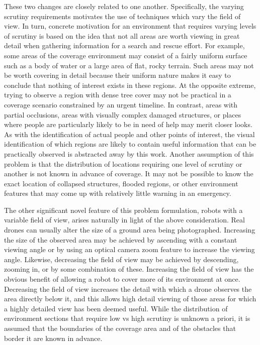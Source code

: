 These two changes are closely related to one another. Specifically, the varying scrutiny requirements motivates the use of techniques which vary the field of view. In turn, concrete motivation for an environment that requires varying levels of scrutiny is based on the idea that not all areas are worth viewing in great detail when gathering information for a search and rescue effort. For example, some areas of the coverage environment may consist of a fairly uniform surface such as a body of water or a large area of flat, rocky terrain. Such areas may not be worth covering in detail because their uniform nature makes it easy to conclude that nothing of interest exists in these regions. At the opposite extreme, trying to observe a region with dense tree cover may not be practical in a coverage scenario constrained by an urgent timeline. In contrast, areas with partial occlusions, areas with visually complex damaged structures, or places where people are particularly likely to be in need of help may merit closer looks. As with the identification of actual people and other points of interest, the visual identification of which regions are likely to contain useful information that can be practically observed is abstracted away by this work. Another assumption of this problem is that the distribution of locations requiring one level of scrutiny or another is not known in advance of coverage. It may not be possible to know the exact location of collapsed structures, flooded regions, or other environment features that may come up with relatively little warning in an emergency.

The other significant novel feature of this problem formulation, robots with a variable field of view, arises naturally in light of the above consideration. Real drones can usually alter the size of a ground area being photographed. Increasing the size of the observed area may be achieved by ascending with a constant viewing angle or by using an optical camera zoom feature to increase the viewing angle. Likewise, decreasing the field of view may be achieved by descending, zooming in, or by some combination of these. Increasing the field of view has the obvious benefit of allowing a robot to cover more of its environment at once. Decreasing the field of view increases the detail with which a drone observes the area directly below it, and this allows high detail viewing of those areas for which a highly detailed view has been deemed useful. While the distribution of environment sections that require low vs high scrutiny is unknown a priori, it is assumed that the boundaries of the coverage area and of the obstacles that border it are known in advance.

